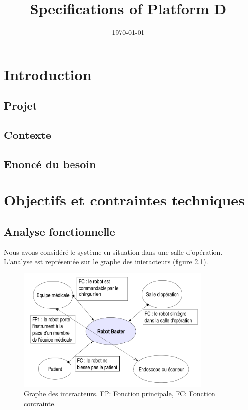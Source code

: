 \documentclass[oneside, DIV=11]{scrreprt}
\title{Specifications of Platform D}
\author{}
\date{\today}
\begin{document}


\tableofcontents
\newpage

\chapter{Introduction}

\section{Projet}


\section{Contexte}



\section{Enoncé du besoin}

\chapter{Objectifs et contraintes techniques}

\section{Analyse fonctionnelle}
Nous avons considéré le système en situation dans une salle d’opération.
L’analyse est représentée sur le graphe des interacteurs (figure \ref{f1}).

\begin{figure}[h]
\centering
\includegraphics[width=0.85\textwidth]{img/grin2.png}
\caption{Graphe des interacteurs. FP: Fonction principale, FC: Fonction contrainte.}
\label{f1}
\end{figure}
\end{document}
